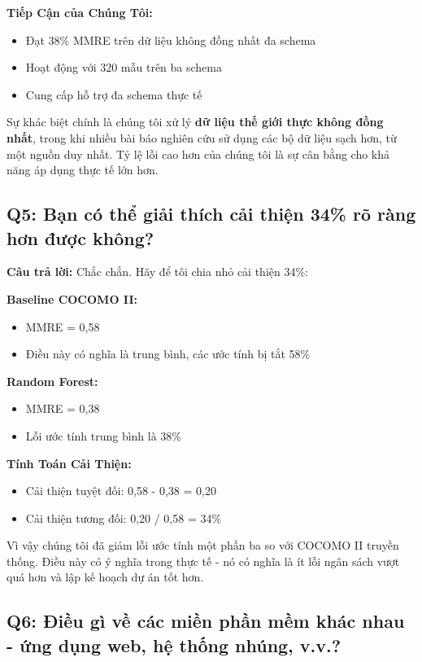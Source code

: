 \documentclass[12pt,a4paper]{article}
\begin{document}
\textbf{Tiếp Cận của Chúng Tôi:}
\begin{itemize}
    \item Đạt 38\% MMRE trên dữ liệu không đồng nhất đa schema
    \item Hoạt động với 320 mẫu trên ba schema
    \item Cung cấp hỗ trợ đa schema thực tế
\end{itemize}

Sự khác biệt chính là chúng tôi xử lý \textbf{dữ liệu thế giới thực không đồng nhất}, trong khi nhiều bài báo nghiên cứu sử dụng các bộ dữ liệu sạch hơn, từ một nguồn duy nhất. Tỷ lệ lỗi cao hơn của chúng tôi là sự cân bằng cho khả năng áp dụng thực tế lớn hơn.

\subsection*{Q5: Bạn có thể giải thích cải thiện 34\% rõ ràng hơn được không?}

\textbf{Câu trả lời:} Chắc chắn. Hãy để tôi chia nhỏ cải thiện 34\%:

\textbf{Baseline COCOMO II:}
\begin{itemize}
    \item MMRE = 0,58
    \item Điều này có nghĩa là trung bình, các ước tính bị tắt 58\%
\end{itemize}

\textbf{Random Forest:}
\begin{itemize}
    \item MMRE = 0,38
    \item Lỗi ước tính trung bình là 38\%
\end{itemize}

\textbf{Tính Toán Cải Thiện:}
\begin{itemize}
    \item Cải thiện tuyệt đối: 0,58 - 0,38 = 0,20
    \item Cải thiện tương đối: 0,20 / 0,58 = 34\%
\end{itemize}

Vì vậy chúng tôi đã giảm lỗi ước tính một phần ba so với COCOMO II truyền thống. Điều này có ý nghĩa trong thực tế - nó có nghĩa là ít lỗi ngân sách vượt quá hơn và lập kế hoạch dự án tốt hơn.

\subsection*{Q6: Điều gì về các miền phần mềm khác nhau - ứng dụng web, hệ thống nhúng, v.v.?}
\end{document}
